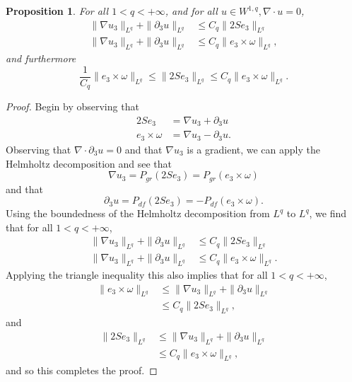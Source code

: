 \documentclass[11pt]{article}
\theoremstyle{plain}
\newtheorem{proposition}[theorem]{Proposition}
\theoremstyle{remark}
\numberwithin{equation}{section}
\begin{document}
\begin{proposition} \label{Equiv}
For all $1<q<+\infty$, and for all $u\in W^{1,q}, \nabla\cdot u=0$,
\begin{align}
    \|\nabla u_3\|_{L^q}+\|\partial_3 u\|_{L^q}
    &\leq C_q \|2Se_3\|_{L^q} \\
    \|\nabla u_3\|_{L^q}+\|\partial_3 u\|_{L^q}
    &\leq C_q \|e_3\times \omega\|_{L^q},
\end{align}
and furthermore
\begin{equation}
    \frac{1}{C_q}\|e_3\times \omega\|_{L^q}
    \leq \|2Se_3\|_{L^q} \leq C_q
    \|e_3\times \omega\|_{L^q}.
\end{equation}
\end{proposition}
\begin{proof}
Begin by observing that
\begin{align}
    2S e_3 &=\nabla u_3+\partial_3 u \\
    e_3\times \omega&= \nabla u_3-\partial_3 u.
\end{align}
Observing that $\nabla \cdot \partial_3 u=0$ and that $\nabla u_3$ is a gradient, we can apply the Helmholtz decomposition and see that
\begin{equation}
    \nabla u_3=P_{gr}(2Se_3)
    =P_{gr}(e_3\times\omega)
\end{equation}
and that
\begin{equation}
    \partial_3 u=P_{df}(2Se_3)
    =-P_{df}(e_3\times\omega).
\end{equation}
Using the boundedness of the Helmholtz decomposition from $L^q$ to $L^q$,
we find that for all $1<q<+\infty$,
\begin{align}
    \|\nabla u_3\|_{L^q}+\|\partial_3 u\|_{L^q}
    &\leq C_q \|2Se_3\|_{L^q} \\
    \|\nabla u_3\|_{L^q}+\|\partial_3 u\|_{L^q}
    &\leq C_q \|e_3\times \omega\|_{L^q}.
\end{align}
Applying the triangle inequality this also implies that for all $1<q<+\infty$,
\begin{align}
    \|e_3\times \omega\|_{L^q}
    &\leq
    \|\nabla u_3\|_{L^q}+\|\partial_3 u\|_{L^q}\\
    &\leq C_q \|2Se_3\|_{L^q},
\end{align}
and
\begin{align}
    \|2Se_3\|_{L^q}
    &\leq
    \|\nabla u_3\|_{L^q}+\|\partial_3 u\|_{L^q}\\
    &\leq C_q \|e_3\times \omega\|_{L^q},
\end{align}
and so this completes the proof.
\end{proof}
\end{document}
